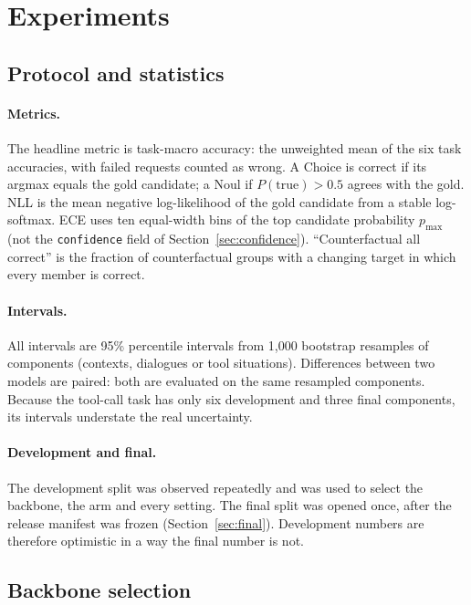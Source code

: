 \section{Experiments}
\label{sec:experiments}

\subsection{Protocol and statistics}
\label{sec:protocol}

\paragraph{Metrics.}
The headline metric is task-macro accuracy: the unweighted mean of the six task accuracies,
with failed requests counted as wrong. A Choice is correct if its argmax equals the gold
candidate; a Noul if $P(\text{true})>0.5$ agrees with the gold. NLL is the mean negative
log-likelihood of the gold candidate from a stable log-softmax. ECE uses ten equal-width bins
of the top candidate probability $p_{\max}$ (not the \texttt{confidence} field of
Section~\ref{sec:confidence}). ``Counterfactual all correct'' is the fraction of
counterfactual groups with a changing target in which every member is correct.

\paragraph{Intervals.}
All intervals are 95\% percentile intervals from 1,000 bootstrap resamples of components
(contexts, dialogues or tool situations). Differences between two models are paired: both
are evaluated on the same resampled components. Because the tool-call task has only six
development and three final components, its intervals understate the real uncertainty.

\paragraph{Development and final.}
The development split was observed repeatedly and was used to select the backbone, the arm
and every setting. The final split was opened once, after the release manifest was frozen
(Section~\ref{sec:final}). Development numbers are therefore optimistic in a way the final
number is not.

\subsection{Backbone selection}
\label{sec:leaderboard}

